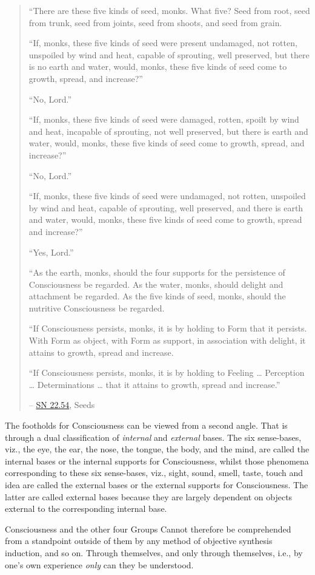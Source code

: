 \begin{quote}
``There are these five kinds of seed, monks. What five? Seed from root, seed from trunk, seed from joints, seed from shoots, and seed from grain.

``If, monks, these five kinds of seed were present undamaged, not rotten, unspoiled by wind and heat, capable of sprouting, well preserved, but there is no earth and water, would, monks, these five kinds of seed come to growth, spread, and increase?''

``No, Lord.''

``If, monks, these five kinds of seed were damaged, rotten, spoilt by wind and heat, incapable of sprouting, not well preserved, but there is earth and water, would, monks, these five kinds of seed come to growth, spread, and increase?''

``No, Lord.''

``If, monks, these five kinds of seed were undamaged, not rotten, unspoiled by wind and heat, capable of sprouting, well preserved, and there is earth and water, would, monks, these five kinds of seed come to growth, spread and increase?''

``Yes, Lord.''

``As the earth, monks, should the four supports for the persistence of Consciousness be regarded. As the water, monks, should delight and attachment be regarded. As the five kinds of seed, monks, should the nutritive Consciousness be regarded.

``If Consciousness persists, monks, it is by holding to Form that it persists. With Form as object, with Form as support, in association with delight, it attains to growth, spread and increase.

``If Consciousness persists, monks, it is by holding to Feeling \ldots{} Perception \ldots{} Determinations \ldots{} that it attains to growth, spread and increase.''

 -- \href{https://suttacentral.net/sn22.54/en/bodhi}{SN 22.54}, Seeds
\end{quote}

The footholds for Consciousness can be viewed from a second angle. That is through a dual classification of \emph{internal} and \emph{external} bases. The six sense-bases, viz., the eye, the ear, the nose, the tongue, the body, and the mind, are called the internal bases or the internal supports for Consciousness, whilst those phenomena corresponding to these six sense-bases, viz., sight, sound, smell, taste, touch and idea are called the external bases or the external supports for Consciousness. The latter are called external bases because they are largely dependent on objects external to the corresponding internal base.

Consciousness and the other four Groups Cannot therefore be comprehended from a standpoint outside of them by any method of objective synthesis induction, and so on. Through themselves, and only through themselves, i.e., by one's own experience \emph{only} can they be understood.
